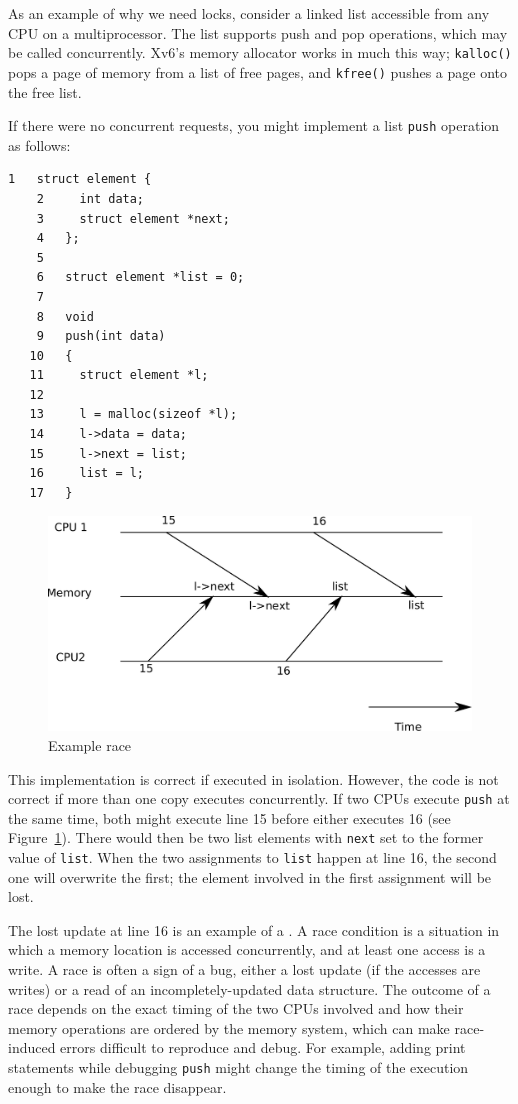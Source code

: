 As an example of why we need locks,
consider a linked list accessible from any
CPU on a multiprocessor.
The list supports push and pop operations, which
may be called concurrently.
Xv6's memory allocator works in much this way;
\lstinline{kalloc()}
pops a page of memory from a list of free pages,
and
\lstinline{kfree()}
pushes a page onto the free list.

If there were no
concurrent requests, you might implement a list
\lstinline{push}
operation as follows:
\begin{lstlisting}[]
    1	struct element {
    2	  int data;
    3	  struct element *next;
    4	};
    5	
    6	struct element *list = 0;
    7	
    8	void
    9	push(int data)
   10	{
   11	  struct element *l;
   12	
   13	  l = malloc(sizeof *l);
   14	  l->data = data;
   15	  l->next = list;
   16	  list = l;
   17	}
\end{lstlisting}

\begin{figure}[t]
\center
\includegraphics[scale=0.5]{fig/race.pdf}
\caption{Example race}
\label{fig:race}
\end{figure}
This implementation is correct if executed in isolation.
However, the code is not correct if more than one
copy executes concurrently.
If two CPUs execute
\lstinline{push}
at the same time,
both might execute line 15
before either executes 16 (see 
Figure~\ref{fig:race}).
There would then be two
list elements with
\lstinline{next}
set to the former value of
\lstinline{list}.
When the two assignments to
\lstinline{list}
happen at line 16,
the second one will overwrite the first;
the element involved in the first assignment
will be lost.

The lost update at line 16 is an example of a
.
A race condition is a situation in which a memory location is accessed
concurrently, and at least one access is a write.
A race is often a sign of a bug, either a lost update
(if the accesses are writes) or a read of
an incompletely-updated data structure.
The outcome of a race depends on
the exact timing of the two CPUs involved and
how their memory operations are ordered by the memory system,
which can make race-induced errors difficult to reproduce
and debug.
For example, adding print statements while debugging
\lstinline{push}
might change the timing of the execution enough
to make the race disappear.

